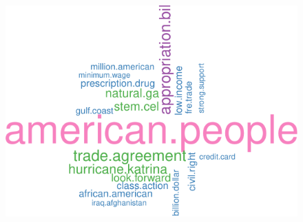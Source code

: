 \documentclass[
  shownotes,
  xcolor={svgnames},
  hyperref={colorlinks,citecolor=DarkBlue,linkcolor=DarkRed,urlcolor=DarkBlue}
  , aspectratio=169]{beamer}
\begin{document}
\begin{frame}[fragile]
  \begin{figure}[H] \centering
            \captionsetup{justification=centering}
              \includegraphics[scale=0.5]{figures/unnamed-chunk-5-1.pdf}
              
 \end{figure}



\end{frame}
\end{document}
